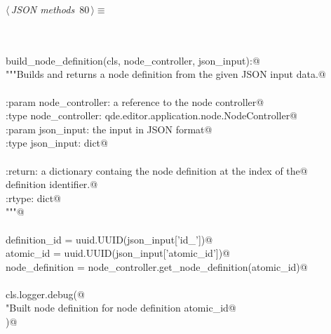 \documentclass[
    a4paper,      %
    10pt,         %
    openright,    %
    notitlepage,  %
    parskip=half, %
]{scrreprt}       %
\theoremstyle{definition}                    %
\begin{document}
\begin{flushleft} \small
\begin{minipage}{\linewidth}\label{scrap130}\raggedright\small
{} $\langle\,${\itshape JSON methods}\nobreak\ {\footnotesize {80}}$\,\rangle\equiv$
\vspace{-1exm}
\begin{list}{}{} \item
\mbox{}\lstinline@@\\
\mbox{}\lstinline@classmethod@\\
\mbox{}\lstinline@def build_node_definition(cls, node_controller, json_input):@\\
\mbox{}\lstinline@    """Builds and returns a node definition from the given JSON input data.@\\
\mbox{}\lstinline@@\\
\mbox{}\lstinline@    :param node_controller: a reference to the node controller@\\
\mbox{}\lstinline@    :type  node_controller: qde.editor.application.node.NodeController@\\
\mbox{}\lstinline@    :param json_input: the input in JSON format@\\
\mbox{}\lstinline@    :type  json_input: dict@\\
\mbox{}\lstinline@@\\
\mbox{}\lstinline@    :return: a dictionary containg the node definition at the index of the@\\
\mbox{}\lstinline@             definition identifier.@\\
\mbox{}\lstinline@    :rtype:  dict@\\
\mbox{}\lstinline@    """@\\
\mbox{}\lstinline@@\\
\mbox{}\lstinline@    definition_id   = uuid.UUID(json_input['id_'])@\\
\mbox{}\lstinline@    atomic_id       = uuid.UUID(json_input['atomic_id'])@\\
\mbox{}\lstinline@    node_definition = node_controller.get_node_definition(atomic_id)@\\
\mbox{}\lstinline@@\\
\mbox{}\lstinline@    cls.logger.debug(@\\
\mbox{}\lstinline@        "Built node definition for node definition %s",@\\
\mbox{}\lstinline@        atomic_id@\\
\mbox{}\lstinline@    )@\\

\end{list}
\end{minipage}
\end{flushleft}
\end{document}
